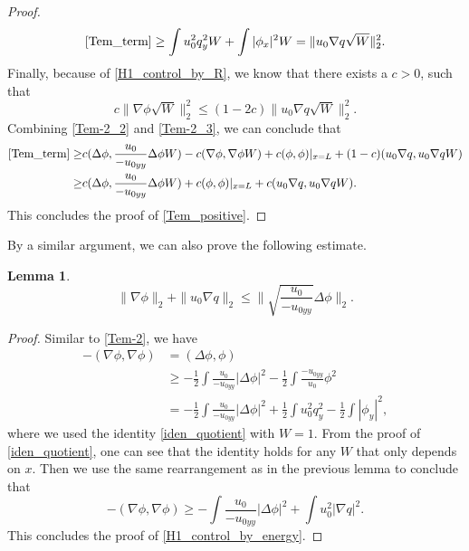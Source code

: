 \documentclass[reqno, 11pt]{amsart}
\theoremstyle{plain}
\newtheorem{lemma}[theorem]{Lemma}
\theoremstyle{definition}
\theoremstyle{remark}
\numberwithin{equation}{section}
\begin{document}
\begin{proof}
\begin{equation}\label{Tem-2_2}
\begin{aligned}
\eqref{Tem_term} \ge \int u_0^2 q_y^2 W +  \int |\phi_x|^2 W = \|u_0 \nabla q \sqrt{W}\|_2^2.
\end{aligned}
\end{equation}
Finally, because of \eqref{H1_control_by_R}, we know that there exists a $c > 0$, such that
\begin{equation}\label{Tem-2_3}
c \| \nabla \phi \sqrt{W}\|_2^2 \le (1-2c) \|u_0 \nabla q \sqrt{W}\|_2^2.
\end{equation}
Combining \eqref{Tem-2_2} and \eqref{Tem-2_3}, we can conclude that
\begin{align*}
\eqref{Tem_term} \ge &c (\Delta {\phi}, \frac{u_0}{-u_{0yy} } \Delta \phi W) -  c (\nabla \phi, \nabla \phi W) + c (\phi, \phi)|_{x=L} +(1-c) ( u_0 \nabla q, u_0 \nabla q W)\\
 \ge &c (\Delta {\phi}, \frac{u_0}{-u_{0yy} } \Delta \phi W) + c (\phi, \phi)|_{x=L} +c ( u_0 \nabla q, u_0 \nabla q W).
\end{align*}
This concludes the proof of \eqref{Tem_positive}.
\end{proof}

By a similar argument, we can also prove the following estimate.
\begin{lemma}
\begin{equation}\label{H1_control_by_energy}
\| \nabla \phi \|_2 + \| u_0 \nabla q\|_2 \le \| \sqrt{\frac{u_0}{-u_{0yy}}} \Delta \phi\|_2.
\end{equation}
\end{lemma}
\begin{proof}
Similar to \eqref{Tem-2}, we have
\begin{align*}
 -  (\nabla \phi, \nabla \phi ) &=  (\Delta \phi, \phi )\\
 & \ge - \frac{1}{2} \int \frac{u_0}{-u_{0yy}} |\Delta \phi|^2 - \frac{1}{2} \int \frac{-u_{0yy}}{u_0} \phi^2 \\
 &= - \frac{1}{2} \int \frac{u_0}{-u_{0yy}} |\Delta \phi|^2 + \frac{1}{2} \int u_0^2 q_y^2 - \frac{1}{2} \int |\phi_y|^2,
\end{align*}
where we used the identity \eqref{iden_quotient} with $W = 1$. From the proof of \eqref{iden_quotient}, one can see that the identity holds for any $W$ that only depends on $x$. Then we use the same rearrangement as in the previous lemma to conclude that
$$
 - (\nabla \phi, \nabla \phi ) \ge - \int \frac{u_0}{-u_{0yy}} |\Delta \phi|^2  + \int u_0^2 |\nabla q|^2. 
$$
This concludes the proof of \eqref{H1_control_by_energy}.
\end{proof}
\end{document}
